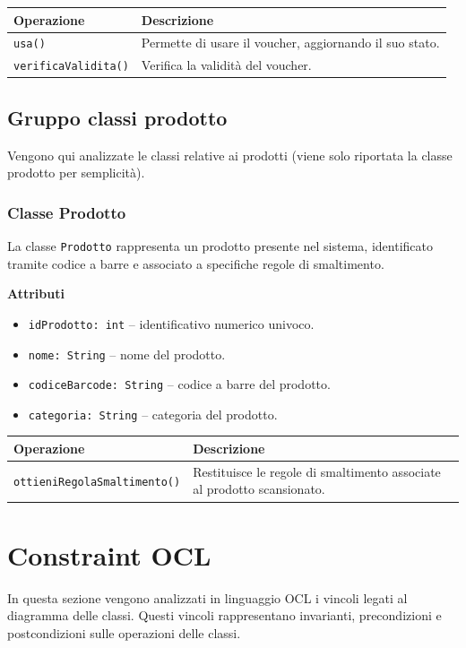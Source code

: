 \documentclass[12pt,a4paper]{article}
\begin{document}
\begin{table}[H]
\centering
\begin{tabularx}{\textwidth}{@{}lX@{}}
\toprule
\textbf{Operazione} & \textbf{Descrizione} \\ \midrule
\texttt{usa()} & Permette di usare il voucher, aggiornando il suo stato. \\
\texttt{verificaValidita()} & Verifica la validità del voucher. \\
\bottomrule
\end{tabularx}
\end{table}

\subsection{Gruppo classi prodotto} 
Vengono qui analizzate le classi relative ai prodotti (viene solo riportata la classe prodotto per semplicità).

\subsubsection{Classe Prodotto}
La classe \texttt{Prodotto} rappresenta un prodotto presente nel sistema, 
identificato tramite codice a barre e associato a specifiche regole di smaltimento.

\textbf{Attributi}
\begin{itemize}
    \item \texttt{idProdotto: int} -- identificativo numerico univoco.
    \item \texttt{nome: String} -- nome del prodotto.
    \item \texttt{codiceBarcode: String} -- codice a barre del prodotto.
    \item \texttt{categoria: String} -- categoria del prodotto.
\end{itemize}

\begin{table}[H]
\centering
\begin{tabularx}{\textwidth}{@{}lX@{}}
\toprule
\textbf{Operazione} & \textbf{Descrizione} \\ \midrule
\texttt{ottieniRegolaSmaltimento()} & Restituisce le regole di smaltimento associate al prodotto scansionato. \\
\bottomrule
\end{tabularx}
\end{table}

\newpage
\section{Constraint OCL} 
In questa sezione vengono analizzati in linguaggio OCL i vincoli legati al diagramma delle classi. Questi vincoli rappresentano invarianti, precondizioni e postcondizioni sulle operazioni delle classi.
\end{document}
